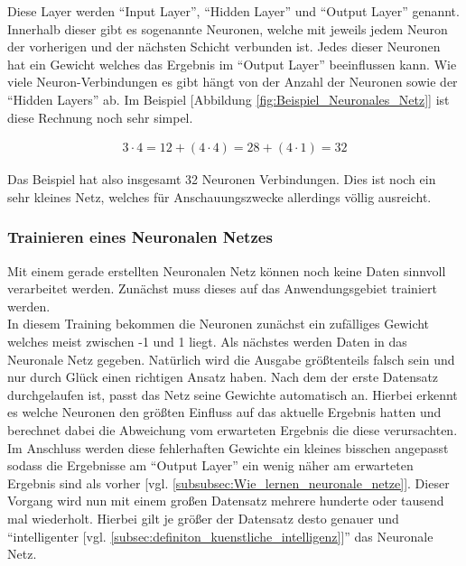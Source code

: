             Diese Layer werden \enquote{Input Layer}, \enquote{Hidden Layer} und \enquote{Output Layer} genannt. Innerhalb dieser gibt es sogenannte Neuronen, welche mit jeweils jedem Neuron der vorherigen und der nächsten Schicht verbunden ist. Jedes dieser Neuronen hat ein Gewicht welches das Ergebnis im \enquote{Output Layer} beeinflussen kann. Wie viele Neuron-Verbindungen es gibt hängt von der Anzahl der Neuronen sowie der \enquote{Hidden Layers} ab. Im Beispiel [Abbildung \ref{fig:Beispiel_Neuronales_Netz}] ist diese Rechnung noch sehr simpel.
            
            \begin{align}
                3 \cdot 4 = 12 + (4 \cdot 4) = 28 + (4 \cdot 1) = 32
            \end{align}
            
            Das Beispiel hat also insgesamt 32 Neuronen Verbindungen. Dies ist noch ein sehr kleines Netz, welches für Anschauungszwecke allerdings völlig ausreicht.\\
        
        \subsubsection{Trainieren eines Neuronalen Netzes}
        \label{subsubsec:trainieren_eines_neuronalen_netzes}
            Mit einem gerade erstellten Neuronalen Netz können noch keine Daten sinnvoll verarbeitet werden. Zunächst muss dieses auf das Anwendungsgebiet trainiert werden.\\
            In diesem Training bekommen die Neuronen zunächst ein zufälliges Gewicht welches meist zwischen -1 und 1 liegt. Als nächstes werden Daten in das Neuronale Netz gegeben. Natürlich wird die Ausgabe größtenteils falsch sein und nur durch Glück einen richtigen Ansatz haben. Nach dem der erste Datensatz durchgelaufen ist, passt das Netz seine Gewichte automatisch an. Hierbei erkennt es welche Neuronen den größten Einfluss auf das aktuelle Ergebnis hatten und berechnet dabei die Abweichung vom erwarteten Ergebnis die diese verursachten. Im Anschluss werden diese fehlerhaften Gewichte ein kleines bisschen angepasst sodass die Ergebnisse am \enquote{Output Layer} ein wenig näher am erwarteten Ergebnis sind als vorher [vgl. \ref{subsubsec:Wie_lernen_neuronale_netze}]. Dieser Vorgang wird nun mit einem großen Datensatz mehrere hunderte oder tausend mal wiederholt. Hierbei gilt je größer der Datensatz desto genauer und \enquote{intelligenter [vgl. \ref{subsec:definiton_kuenstliche_intelligenz}]} das Neuronale Netz.
    
